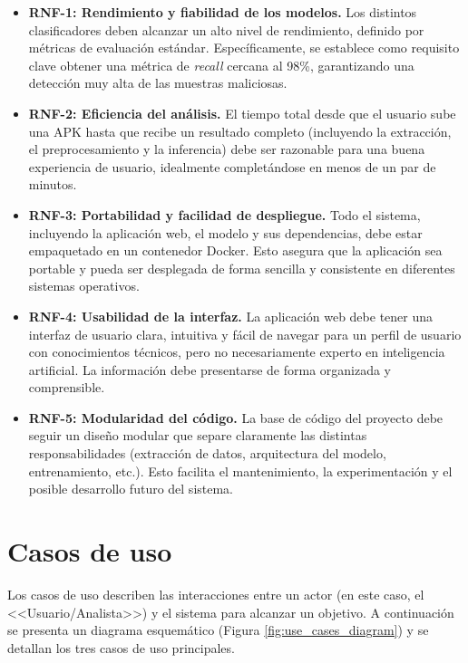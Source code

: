 \begin{itemize}
	\item \textbf{RNF-1: Rendimiento y fiabilidad de los modelos.} Los distintos clasificadores deben alcanzar un alto nivel de rendimiento, definido por métricas de evaluación estándar. Específicamente, se establece como requisito clave obtener una métrica de \textit{recall} cercana al 98\%, garantizando una detección muy alta de las muestras maliciosas.
	
	\item \textbf{RNF-2: Eficiencia del análisis.} El tiempo total desde que el usuario sube una APK hasta que recibe un resultado completo (incluyendo la extracción, el preprocesamiento y la inferencia) debe ser razonable para una buena experiencia de usuario, idealmente completándose en menos de un par de minutos.
	
	\item \textbf{RNF-3: Portabilidad y facilidad de despliegue.} Todo el sistema, incluyendo la aplicación web, el modelo y sus dependencias, debe estar empaquetado en un contenedor Docker. Esto asegura que la aplicación sea portable y pueda ser desplegada de forma sencilla y consistente en diferentes sistemas operativos.
	
	\item \textbf{RNF-4: Usabilidad de la interfaz.} La aplicación web debe tener una interfaz de usuario clara, intuitiva y fácil de navegar para un perfil de usuario con conocimientos técnicos, pero no necesariamente experto en inteligencia artificial. La información debe presentarse de forma organizada y comprensible.
	
	\item \textbf{RNF-5: Modularidad del código.} La base de código del proyecto debe seguir un diseño modular que separe claramente las distintas responsabilidades (extracción de datos, arquitectura del modelo, entrenamiento, etc.). Esto facilita el mantenimiento, la experimentación y el posible desarrollo futuro del sistema.
\end{itemize}

\section{Casos de uso}
Los casos de uso describen las interacciones entre un actor (en este caso, el <<Usuario/Analista>>) y el sistema para alcanzar un objetivo. A continuación se presenta un diagrama esquemático (Figura \ref{fig:use_cases_diagram}) y se detallan los tres casos de uso principales.

